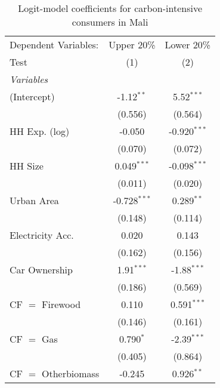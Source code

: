 
\begin{table}[htbp!]
   \centering
   \small
   \begin{adjustbox}{width = 1\textwidth, max height = 0.95\textheight, center}
      \begin{threeparttable}[b]
         \caption{\label{tab:Logit_1_MLI} Logit-model coefficients for carbon-intensive consumers in Mali}
         \begin{tabular}{lcc}
            \tabularnewline \midrule \midrule
            Dependent Variables: & Upper 20\%     & Lower 20\%\\   
            Test                 & (1)            & (2)\\  
            \midrule
            \emph{Variables}\\
            (Intercept)          & -1.12$^{**}$   & 5.52$^{***}$\\   
                                 & (0.556)        & (0.564)\\   
            HH Exp. (log)        & -0.050         & -0.920$^{***}$\\   
                                 & (0.070)        & (0.072)\\   
            HH Size              & 0.049$^{***}$  & -0.098$^{***}$\\   
                                 & (0.011)        & (0.020)\\   
            Urban Area           & -0.728$^{***}$ & 0.289$^{**}$\\   
                                 & (0.148)        & (0.114)\\   
            Electricity Acc.     & 0.020          & 0.143\\   
                                 & (0.162)        & (0.156)\\   
            Car Ownership        & 1.91$^{***}$   & -1.88$^{***}$\\   
                                 & (0.186)        & (0.569)\\   
            CF $=$ Firewood      & 0.110          & 0.591$^{***}$\\   
                                 & (0.146)        & (0.161)\\   
            CF $=$ Gas           & 0.790$^{*}$    & -2.39$^{***}$\\   
                                 & (0.405)        & (0.864)\\   
            CF $=$ Otherbiomass  & -0.245         & 0.926$^{**}$\\   

\end{tabular}
\end{threeparttable}
\end{adjustbox}
\end{table}
